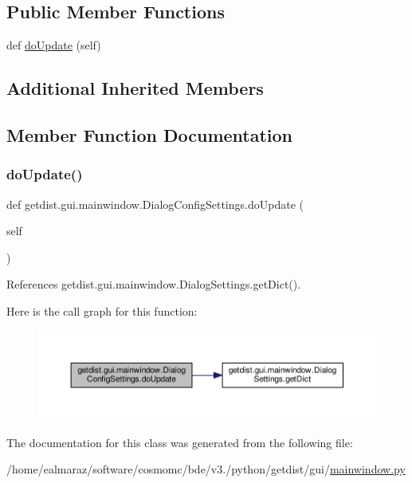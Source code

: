 \subsection*{Public Member Functions}
\begin{DoxyCompactItemize}
\item 
def \mbox{\hyperlink{classgetdist_1_1gui_1_1mainwindow_1_1DialogConfigSettings_aae96a4d560c1f5d0bcebb1e67596b01e}{do\+Update}} (self)
\end{DoxyCompactItemize}
\subsection*{Additional Inherited Members}


\subsection{Member Function Documentation}
\mbox{\label{classgetdist_1_1gui_1_1mainwindow_1_1DialogConfigSettings_aae96a4d560c1f5d0bcebb1e67596b01e}} 
\subsubsection{\texorpdfstring{do\+Update()}{doUpdate()}}
{\footnotesize\ttfamily def getdist.\+gui.\+mainwindow.\+Dialog\+Config\+Settings.\+do\+Update (\begin{DoxyParamCaption}\item[{}]{self }\end{DoxyParamCaption})}



References getdist.\+gui.\+mainwindow.\+Dialog\+Settings.\+get\+Dict().

Here is the call graph for this function\+:
\nopagebreak
\begin{figure}[H]
\begin{center}
\leavevmode
\includegraphics[width=350pt]{classgetdist_1_1gui_1_1mainwindow_1_1DialogConfigSettings_aae96a4d560c1f5d0bcebb1e67596b01e_cgraph}
\end{center}
\end{figure}


The documentation for this class was generated from the following file\+:\begin{DoxyCompactItemize}
\item 
/home/ealmaraz/software/cosmomc/bde/v3./python/getdist/gui/\mbox{\hyperlink{mainwindow_8py}{mainwindow.\+py}}\end{DoxyCompactItemize}
